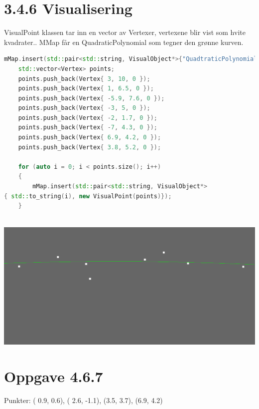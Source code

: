 \documentclass[a4paper,norsk]{article}
\begin{document}
\section{3.4.6 Visualisering}
VisualPoint klassen tar inn en vector av Vertexer, vertexene blir vist som hvite kvadrater.. MMap får en QuadraticPolynomial som tegner den grønne kurven.
\begin{lstlisting}[language=C++, caption={renderwindow.cpp}]
    mMap.insert(std::pair<std::string, VisualObject*>{"QuadtraticPolynomial", new QuadtraticPolynomial(-0.012024466, -0.029310073f, 5.856566423f, 0.1f)});
    std::vector<Vertex> points;
    points.push_back(Vertex{ 3, 10, 0 });
    points.push_back(Vertex{ 1, 6.5, 0 });
    points.push_back(Vertex{ -5.9, 7.6, 0 });
    points.push_back(Vertex{ -3, 5, 0 });
    points.push_back(Vertex{ -2, 1.7, 0 });
    points.push_back(Vertex{ -7, 4.3, 0 });
    points.push_back(Vertex{ 6.9, 4.2, 0 });
    points.push_back(Vertex{ 3.8, 5.2, 0 });

    for (auto i = 0; i < points.size(); i++) 
    {
        mMap.insert(std::pair<std::string, VisualObject*>
{ std::to_string(i), new VisualPoint(points)});
    }
    
\end{lstlisting}
\centering
\includegraphics[width=\textwidth]{kurve1}


\section{Oppgave 4.6.7}
Punkter: ( 0.9, 0.6), ( 2.6, -1.1), (3.5, 3.7), (6.9, 4.2) 
\newline
\end{document}
